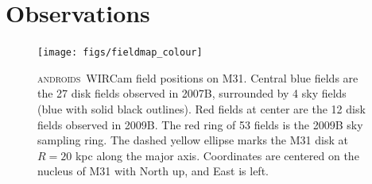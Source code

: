 \documentclass[iop]{emulateapj}
\newcommand{\androids}{\textsc{androids}}
\begin{document}
\section{Observations}
\label{sec:Observations}

\begin{figure}[t]
\centering
\texttt{[image: figs/fieldmap\_colour]}
\caption{\androids\ WIRCam field positions on M31.
Central blue fields are the 27 disk fields observed in 2007B, surrounded by 4 sky fields (blue with solid black outlines).
Red fields at center are the 12 disk fields observed in 2009B.
The red ring of 53 fields is the 2009B sky sampling ring.
The dashed yellow ellipse marks the M31 disk at $R=20$ kpc along the major axis.
Coordinates are centered on the nucleus of M31 with North up, and East is left.}
\label{fig:fieldmap}
\end{figure}

\end{document}
